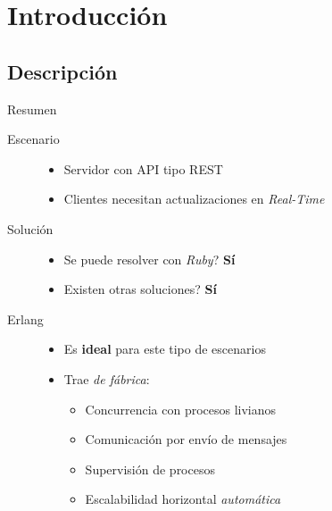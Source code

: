 \documentclass[utf8,hyperref={colorlinks=true}]{beamer}
\begin{document}
\section{Introducci\'on}
\subsection{Descripci\'on}
\begin{frame}{Resumen}

\begin{description}
	\item[Escenario]
		\begin{itemize}
			\item Servidor con API tipo REST
			\item Clientes necesitan actualizaciones en \emph{Real-Time}
		\end{itemize}
	\pause
	\item[Soluci\'on]
		\begin{itemize}
			\item Se puede resolver con \emph{Ruby}? \textbf{S\'i}
			\item Existen otras soluciones? \textbf{S\'i}
		\end{itemize}
	\pause
	\item[Erlang]
		\begin{itemize}
			\item Es \textbf{ideal} para este tipo de escenarios
			\item Trae \emph{de f\'abrica}:
			\begin{itemize}
				\item Concurrencia con procesos livianos
				\item Comunicaci\'on por env\'io de mensajes
				\item Supervisi\'on de procesos
				\item Escalabilidad horizontal \emph{autom\'atica}
			\end{itemize}
		\end{itemize}
\end{description}

\end{frame}
\end{document}

